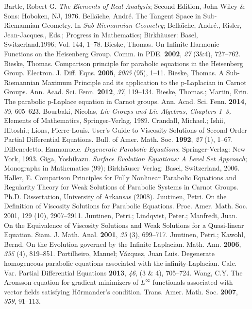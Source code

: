 \documentclass[12pt]{amsart}
\theoremstyle{definition}
\theoremstyle{remark}
\numberwithin{equation}{section}
\begin{document}
\begin{thebibliography}{BBM}
Bartle, Robert G. \emph{The Elements of Real Analysis}; Second Edition, John Wiley \& Sons: Hoboken, NJ, 1976.  
Bella\" {\i}che, Andr\' {e}. The Tangent Space in Sub-Riemannian Geometry. In \emph{Sub-Riemannian Geometry}; Bella\" {\i}che, Andr\' {e}., Risler, Jean-Jacques., Eds.; Progress in Mathematics;  Birkh\" {a}user: Basel, Switzerland.1996; Vol. 144, 1--78.
Bieske, Thomas. On Infinite Harmonic Functions on
the Heisenberg Group. Comm. in PDE. \textbf{2002}, \emph{27} (3\&4), 727--762.
Bieske, Thomas. Comparison principle for parabolic equations in the Heisenberg Group. Electron. J. Diff. Eqns. \textbf{2005}, \emph{2005} (95), 1--11. 
Bieske, Thomas. A Sub-Riemannian Maximum Principle and its application to the p-Laplacian in Carnot Groups. Ann. Acad. Sci. Fenn. \textbf{2012}, \emph{37}, 119--134.
 Bieske, Thomas.; Martin, Erin. The parabolic p-Laplace equation in Carnot groups. Ann. Acad. Sci. Fenn. \textbf{2014}, \emph{39}, 605--623. 
Bourbaki, Nicolas, \emph{Lie Groups and Lie Algebras, Chapters   1--3,} Elements of Mathematics, Springer-Verlag, 1989.
Crandall, Michael.; Ishii, Hitoshi.; 
Lions, Pierre-Louis.  User's Guide to Viscosity Solutions of Second Order
Partial Differential Equations. Bull. of Amer. Math. Soc. \textbf{1992}, \emph{27} 
(1), 1--67. 
DiBenedetto, Emmanuele. \emph{Degenerate Parabolic Equations}; Springer-Verlag: New York, 1993.  
 Giga, Yoshikazu. \emph{Surface Evolution Equations: A Level Set Approach}; Monographs in Mathematics (99); Birkh\"{a}user Verlag: Basel, Switzerland, 2006.
Haller, E. Comparison Principles for Fully Nonlinear Parabolic Equations and 
Regularity Theory for Weak Solutions of Parabolic Systems in Carnot Groups. Ph.D. Dissertation, University of Arkansas (2008).
 Juutinen, Petri. On the Definition of Viscosity Solutions for Parabolic Equations. Proc. Amer. Math. Soc. 2001, 129 (10), 2907--2911. 
Juutinen, Petri.; Lindqvist, Peter.; Manfredi, Juan. On the Equivalence of Viscosity Solutions and Weak Solutions for a Quasi-linear Equation. Siam. J. Math. Anal. \textbf{2001}, \emph{33} (3), 699--717.
Juutinen, Petri.; Kawohl, Bernd. On the Evolution governed by the Infinite Laplacian. Math. Ann. \textbf{2006}, \emph{335} (4), 819--851.
 Portilheiro, Manuel; V\'{a}zquez, Juan Luis. Degenerate homogeneous parabolic equations associated with the infinity-Laplacian. Calc. Var. Partial Differential Equations \textbf{2013}, \emph{46}, (3 \& 4), 705--724. 
 Wang, C.Y. The Aronsson equation for gradient minimizers of ${L^\infty}$-functionals associated with vector fields satisfying H\"{o}rmander's condition. Trans. Amer. Math. Soc. \textbf{2007}, \emph{359}, 91--113. 
\end{thebibliography}
\end{document}
